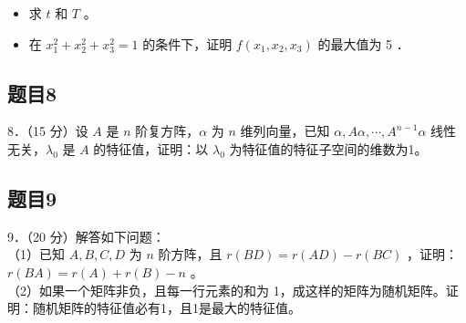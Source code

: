 \documentclass{article}
\begin{document}
\begin{itemize}
  \item[（1）] 求 \(t\) 和 \(T\) 。
  \item[（2）] 在 \(x_{1}^{2}+x_{2}^{2}+x_{3}^{2}=1\) 的条件下，证明 \(f\left(x_{1}, x_{2}, x_{3}\right)\) 的最大值为 5 ．
\end{itemize}

\subsection{题目8}
8．（15 分）设 \(A\) 是 \(n\) 阶复方阵，\(\alpha\) 为 \(n\) 维列向量，已知 \(\alpha, A \alpha, \cdots, A^{n-1} \alpha\) 线性无关，\(\lambda_{0}\) 是 \(A\) 的特征值，证明：以 \(\lambda_{0}\) 为特征值的特征子空间的维数为1。

\subsection{题目9}
9．（20 分）解答如下问题：\\
（1）已知 \(A, B, C, D\) 为 \(n\) 阶方阵，且 \(r(B D)=r(A D)-r(B C)\) ，证明：\(r(B A)=r(A)+r(B)-n\) 。\\
（2）如果一个矩阵非负，且每一行元素的和为 1，成这样的矩阵为随机矩阵。证明：随机矩阵的特征值必有1，且1是最大的特征值。
\end{document}
